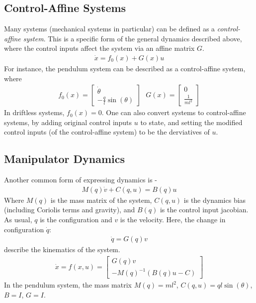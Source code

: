 \subsection{Control-Affine Systems}
Many systems (mechanical systems in particular) can be defined as a \textit{control-affine system}. This is a specific form of the general dynamics described above, where the control inputs affect the system via an affine matrix $G$. 
\begin{align}
    \dot{x} = f_{0} (x) + G(x) u 
\end{align}
For instance, the pendulum system can be described as a control-affine system, where 
\begin{align}
    f_{0}(x) = \begin{bmatrix}
        \dot{\theta} \\
        - \frac{q}{l} \sin(\theta)
    \end{bmatrix}
    \ \ \
    G(x) = \begin{bmatrix}
        0 \\
        \frac{1}{ml^2}
    \end{bmatrix}
\end{align}
In driftless systems, $f_{0}(x)=0$. One can also convert systems to control-affine systems, by adding original control inputs $u$ to state, and setting the modified control inputs (of the control-affine system) to be the derviatives of $u$.

\subsection{Manipulator Dynamics}
Another common form of expressing dynamics is - 
\begin{align}
    M(q) \dot{v} + C(q,u) = B(q) u
\end{align}
Where $M(q)$ is the mass matrix of the system, $C(q,u)$ is the dynamics bias (including Coriolis terms and gravity), and $B(q)$ is the control input jacobian. As usual, $q$  is the configuration and $v$ is the velocity. 
Here, the change in configuration $\dot{q}$:
\begin{align}
    \dot{q} = G(q) v
\end{align}
describe the kinematics of the system.
\begin{align}
    \dot{x} = f(x,u) = \begin{bmatrix}
        G(q) v \\
        -{M(q)}^{-1} ( B(q) u - C ) 
    \end{bmatrix}
\end{align}
In the pendulum system, the mass matrix $M(q) = ml^2$, $C(q,u) = q l \sin(\theta)$, $B=I$, $G=I$.\\

